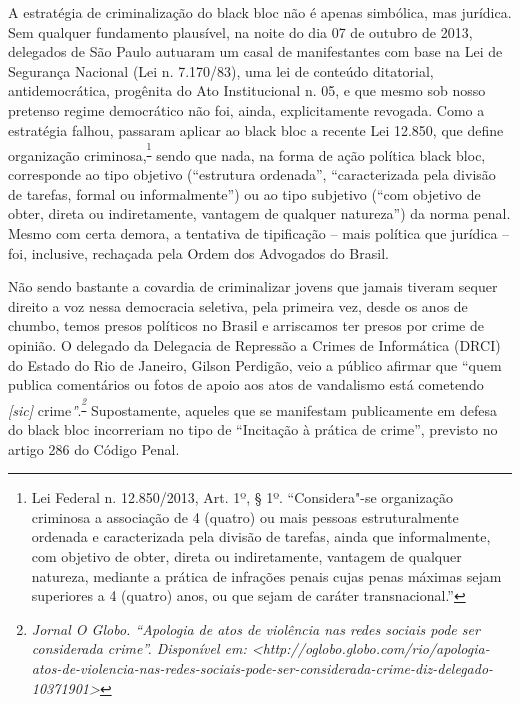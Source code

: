 A estratégia de criminalização do black bloc não é apenas simbólica, mas
jurídica. Sem qualquer fundamento plausível, na noite do dia 07 de
outubro de 2013, delegados de São Paulo autuaram um casal de
manifestantes com base na Lei de Segurança Nacional (Lei n. 7.170/83),
uma lei de conteúdo ditatorial, antidemocrática, progênita do Ato
Institucional n. 05, e que mesmo sob nosso pretenso regime democrático
não foi, ainda, explicitamente revogada. Como a estratégia falhou,
passaram aplicar ao black bloc a recente Lei 12.850, que define
organização criminosa,\textsuperscript{\footnote{Lei Federal n.
  12.850/2013, Art. 1º, § 1º. ``Considera"-se organização criminosa a
  associação de 4 (quatro) ou mais pessoas estruturalmente ordenada e
  caracterizada pela divisão de tarefas, ainda que informalmente, com
  objetivo de obter, direta ou indiretamente, vantagem de qualquer
  natureza, mediante a prática de infrações penais cujas penas máximas
  sejam superiores a 4 (quatro) anos, ou que sejam de caráter
  transnacional.''}} sendo que nada, na forma de ação política black
bloc, corresponde ao tipo objetivo (``estrutura ordenada'',
``caracterizada pela divisão de tarefas, formal ou informalmente'') ou
ao tipo subjetivo (``com objetivo de obter, direta ou indiretamente,
vantagem de qualquer natureza'') da norma penal. Mesmo com certa demora,
a tentativa de tipificação -- mais política que jurídica -- foi,
inclusive, rechaçada pela Ordem dos Advogados do Brasil.

Não sendo bastante a covardia de criminalizar jovens que jamais tiveram
sequer direito a voz nessa democracia seletiva, pela primeira vez, desde
os anos de chumbo, temos presos políticos no Brasil e arriscamos ter
presos por crime de opinião. O delegado da Delegacia de Repressão a
Crimes de Informática (DRCI) do Estado do Rio de Janeiro, Gilson
Perdigão, veio a público afirmar que ``quem publica comentários ou fotos
de apoio aos atos de vandalismo está cometendo \emph{[sic]}
crime\emph''.\textsuperscript{\emph{\footnote{\emph{Jornal O Globo.
  ``Apologia de atos de violência nas redes sociais pode ser considerada
  crime''. Disponível em:
  \textless{}}{\emph{http://oglobo.globo.com/rio/apologia-atos-de-violencia-nas-redes-sociais-pode-ser-considerada-crime-diz-delegado-10371901}}\emph{\textgreater{}}}}}\emph{
}Supostamente, aqueles que se manifestam publicamente em defesa do black
bloc incorreriam no tipo de ``Incitação à prática de crime'', previsto
no artigo 286 do Código Penal.


